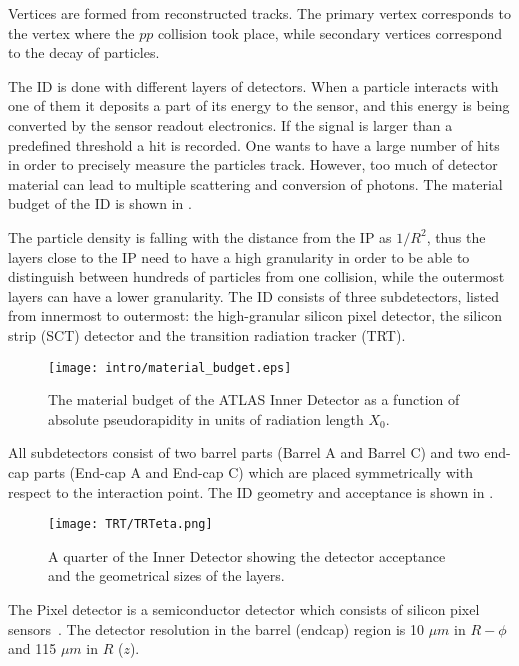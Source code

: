 Vertices are formed from reconstructed tracks. The primary vertex corresponds to the vertex where the $pp$ collision took place, 
while secondary vertices correspond to the decay of particles.

The ID is done with different layers of detectors. When a particle interacts with one of them it deposits a part of its energy to the sensor,
and this energy is being converted by the sensor readout electronics. 
If the signal is larger than a predefined threshold a hit is recorded.
One wants to have a large number of hits in order to precisely measure the particles track.  
However, too much of detector material can lead to multiple scattering and conversion of photons.
The material  budget of the ID is shown in .

The particle density is falling with the distance from the IP as $1/R^2$, 
thus the layers close to the IP need to have a high granularity in order to be able to distinguish between
hundreds of particles from one \pp collision, while the outermost layers can have a lower granularity.
The ID consists of three subdetectors, listed from innermost to outermost: the high-granular silicon pixel detector, the silicon strip (SCT) detector and the transition radiation tracker (TRT).


\begin{figure}
\centering
\texttt{[image: intro/material\_budget.eps]}
\caption{ 
The material budget of the ATLAS Inner Detector as a function of absolute pseudorapidity in units of radiation length $X_0$.
}
\label{fig:material_budget}
\end{figure}




All subdetectors consist of two barrel parts (Barrel A and Barrel C) and two end-cap parts (End-cap A and End-cap C) 
which are placed symmetrically with respect to the interaction point.
The ID geometry and acceptance is shown in .

\begin{figure}
\centering
\texttt{[image: TRT/TRTeta.png]}
\caption{ 
A quarter of the Inner Detector showing the detector acceptance and the geometrical sizes of the layers.
}
\label{fig:ID_eta}
\end{figure}


The Pixel detector is a semiconductor detector which consists of silicon pixel sensors~\cite{Wermes:381263}.
The detector resolution in the barrel (endcap) region is 10 $\mu m$ in $R-\phi$ and 115 $\mu m$ in $R$ ($z$).

